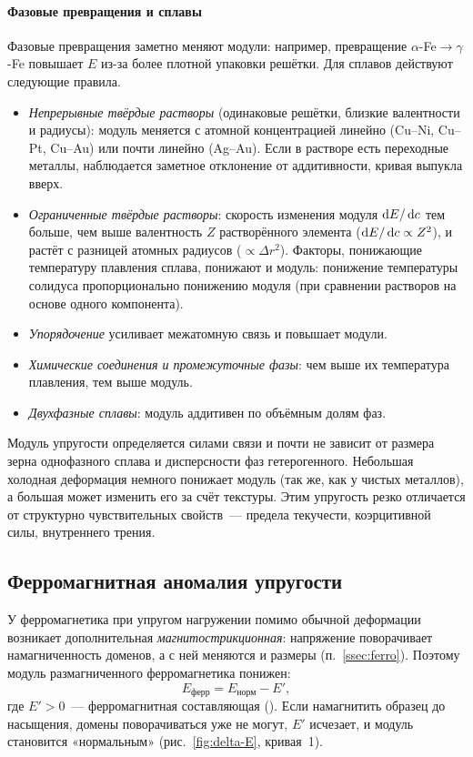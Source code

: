\paragraph{Фазовые превращения и сплавы}
Фазовые превращения заметно меняют модули: например, превращение
$\alpha$-Fe$\to\gamma$-Fe повышает $E$ из-за более плотной упаковки решётки.
Для сплавов действуют следующие правила.
\begin{itemize}
\item \emph{Непрерывные твёрдые растворы} (одинаковые решётки, близкие
валентности и радиусы): модуль меняется с атомной концентрацией линейно
(Cu--Ni, Cu--Pt, Cu--Au) или почти линейно (Ag--Au). Если в растворе есть
переходные металлы, наблюдается заметное отклонение от аддитивности,
кривая выпукла вверх.
\item \emph{Ограниченные твёрдые растворы}: скорость изменения модуля
$\mathop{}\!\mathrm{d} E/\mathop{}\!\mathrm{d} c$ тем больше, чем выше валентность $Z$ растворённого элемента
($\mathop{}\!\mathrm{d} E/\mathop{}\!\mathrm{d} c\propto Z^2$), и растёт с разницей атомных радиусов
($\propto\Delta r^2$). Факторы, понижающие температуру плавления сплава,
понижают и модуль: понижение температуры солидуса пропорционально
понижению модуля (при сравнении растворов на основе одного компонента).
\item \emph{Упорядочение} усиливает межатомную связь и повышает модули.
\item \emph{Химические соединения и промежуточные фазы}: чем выше их
температура плавления, тем выше модуль.
\item \emph{Двухфазные сплавы}: модуль аддитивен по объёмным долям фаз.
\end{itemize}

\begin{glavnoe}
Модуль упругости определяется силами связи и почти не зависит от
размера зерна однофазного сплава и дисперсности фаз гетерогенного.
Небольшая холодная деформация немного понижает модуль (так же, как у
чистых металлов), а большая может изменить его за счёт текстуры. Этим
упругость резко отличается от структурно чувствительных свойств~—
предела текучести, коэрцитивной силы, внутреннего трения.
\end{glavnoe}

\subsection{Ферромагнитная аномалия упругости}\label{ssec:delta-E}

У ферромагнетика при упругом нагружении помимо обычной деформации
возникает дополнительная \emph{магнитострикционная}: напряжение
поворачивает намагниченность доменов, а с ней меняются и размеры
(п.~\ref{ssec:ferro}). Поэтому модуль размагниченного ферромагнетика
понижен:
\begin{equation}\label{eq:delta-E}
E_\text{ферр}=E_\text{норм}-E',
\end{equation}
где $E'>0$~— ферромагнитная составляющая (). Если
намагнитить образец до насыщения, домены поворачиваться уже не могут,
$E'$ исчезает, и модуль становится «нормальным» (рис.~\ref{fig:delta-E},
кривая~1).

